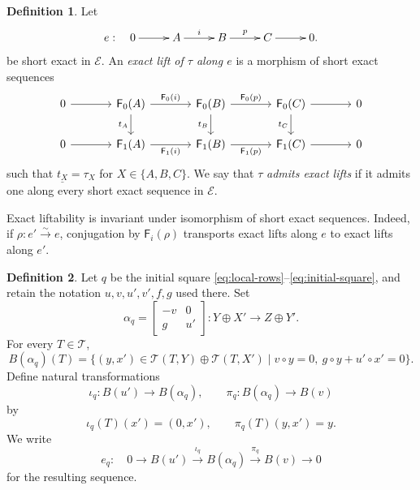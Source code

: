\documentclass[a4paper,11pt,reqno]{amsart}
\theoremstyle{definition}
\newtheorem{definition}[definition]{Definition}
\theoremstyle{plain}
\numberwithin{equation}{section}
\newcommand{\T}{\mathcal T}
\begin{document}
\begin{definition}
\label{def:exact-lift}
Let
\begin{equation*}
\xymatrix@C=2.2pc{
e:\quad0\ar[r]&A\ar[r]^-{i}&B\ar[r]^-{p}&C\ar[r]&0.
}
\end{equation*}
be short exact in \(\mathcal E\).  An \emph{exact lift of \(\tau\) along
\(e\)} is a morphism of short exact sequences
\begin{equation}
\label{eq:exact-lift-diagram}
\begin{tikzcd}[column sep=large]
0\arrow[r]&\mathsf F_0(A)\arrow[r,"\mathsf F_0(i)"]\arrow[d,"t_A"']&
\mathsf F_0(B)\arrow[r,"\mathsf F_0(p)"]\arrow[d,"t_B"']&
\mathsf F_0(C)\arrow[r]\arrow[d,"t_C"']&0\\
0\arrow[r]&\mathsf F_1(A)\arrow[r,"\mathsf F_1(i)"']&
\mathsf F_1(B)\arrow[r,"\mathsf F_1(p)"']&\mathsf F_1(C)\arrow[r]&0
\end{tikzcd}
\end{equation}
such that \(\underline{t_X}=\tau_X\) for \(X\in\{A,B,C\}\).  We say that
\(\tau\) \emph{admits exact lifts} if it admits one along every short exact
sequence in \(\mathcal E\).
\end{definition}

Exact liftability is invariant under isomorphism of short exact sequences.
Indeed, if \(\rho:e'\xrightarrow{\sim}e\), conjugation by
\(\mathsf F_i(\rho)\) transports exact lifts along \(e\) to exact lifts
along \(e'\).


\begin{definition}
\label{def:square-extension}
Let \(q\) be the initial square
\eqref{eq:local-rows}--\eqref{eq:initial-square}, and retain the notation
\(u,v,u',v',f,g\) used there.  Set
\[
 \alpha_q=
 \begin{bmatrix}-v&0\\ g&u'\end{bmatrix}:
 Y\oplus X'\longrightarrow Z\oplus Y'.
\]
For every \(T\in\T\),
\[
 B(\alpha_q)(T)=
 \bigl\{(y,x')\in\T(T,Y)\oplus\T(T,X')\mid
 v\circ y=0,\ g\circ y+u'\circ x'=0\bigr\}.
\]
Define natural transformations
\[
 \iota_q:B(u')\longrightarrow B(\alpha_q),
 \qquad
 \pi_q:B(\alpha_q)\longrightarrow B(v)
\]
by
\[
 \iota_q(T)(x')=(0,x'),
 \qquad
 \pi_q(T)(y,x')=y.
\]
We write
\begin{equation}
\label{eq:square-extension}
 e_q:\quad
 0\longrightarrow B(u')\xrightarrow{\iota_q}B(\alpha_q)
 \xrightarrow{\pi_q}B(v)\longrightarrow0
\end{equation}
for the resulting sequence.
\end{definition}
\end{document}
